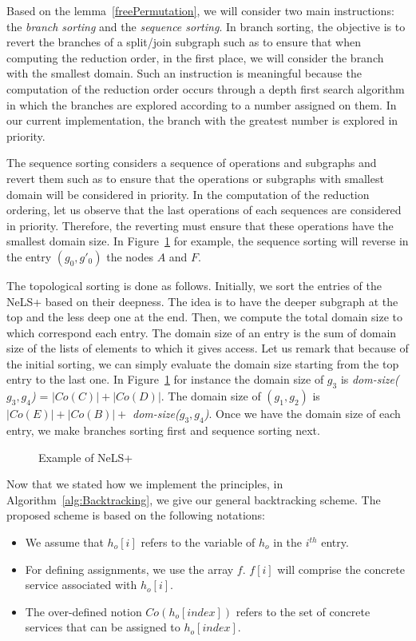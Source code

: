 \documentclass[a4paper]{article}
\begin{document}
Based on the lemma~\ref{freePermutation}, we will consider two main instructions: the {\it branch sorting} and the 
{\it sequence sorting}. In branch sorting, the objective is to revert the branches of a split/join subgraph such as to 
ensure that when computing the reduction order, in  the first place, we will consider the branch with the smallest domain. 
Such an instruction is meaningful because the computation of the reduction order occurs through a 
depth first search algorithm in which the branches are explored according to a number assigned on them. 
In our current implementation, the branch with the greatest number is explored in priority.

The  sequence sorting considers a sequence of operations and subgraphs and revert them such as to ensure 
that the operations or subgraphs with smallest domain will be considered in priority. In the computation of the 
reduction ordering, let us observe that the last operations of each sequences are considered in priority. Therefore, 
the reverting must ensure that these operations have the smallest domain size. In Figure~\ref{transClosureExample} 
for example, the sequence sorting will reverse in the entry  $(g_0, g'_0)$ the nodes $A$ and $F$. 

The topological sorting is done as follows. Initially, we sort the entries of the NeLS+ based on their deepness. 
The idea is to have the deeper subgraph at the top and the less deep one at the end. 
Then, we compute the total domain size to which correspond 
each entry. The domain size of an entry is the sum of domain size of the lists of elements to which 
it gives access. Let us remark that because of the initial sorting, we can simply evaluate the domain size starting from the 
top entry to the last one. In Figure~\ref{transClosureExample} for instance the domain size of $g_3$ is {\it dom-size($g_3,g_4$)} = $|Co(C)| + |Co(D)|$. The domain size of $(g_1, g_2)$ is $|Co(E)| + |Co(B)| + $ {\it dom-size($g_3,g_4$)}. 
Once we have the domain size of each entry, we make branches sorting first and sequence sorting next. 

\begin{figure}[htbp]
\centering
{}
\caption{Example of NeLS+}\label{transClosureExample}
\end{figure}

Now that we stated how we implement the principles, in Algorithm~\ref{alg:Backtracking}, we give  
our general backtracking scheme. 
The proposed scheme is based on the following notations:
\begin{itemize}
\item  We assume that $h_o[i]$ refers to the variable of $h_o$  in the $i^{th}$ entry.
\item For defining assignments, we use the array $f$. $f[i]$ will comprise the concrete service 
associated with $h_o[i]$.
\item The over-defined notion $Co(h_o[index])$ refers to the set of concrete services that can be assigned to $h_o[index]$.
\end{itemize}
\end{document}
